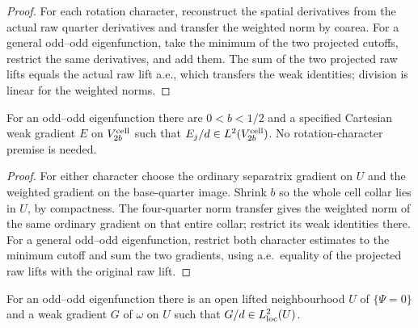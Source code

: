 \begin{proof}
\leanok
For each rotation character, reconstruct the spatial derivatives from
the actual raw quarter derivatives and transfer the weighted norm by coarea.
For a general odd--odd eigenfunction, take the minimum of the two projected
cutoffs, restrict the same derivatives, and add them.
The sum of the two projected raw lifts equals the actual raw lift a.e.,
which transfers the weak identities; division is linear for the weighted norms.
\end{proof}

\begin{lemma}
\label{lem:dd-cell-weighted-gradient}
\leanok
For an odd--odd eigenfunction there are $0<b<1/2$ and a specified
Cartesian weak gradient $E$ on $V_{2b}^{\rm cell}$ such that
$E_j/d\in L^2(V_{2b}^{\rm cell})$.
No rotation-character premise is needed.
\end{lemma}

\begin{proof}
\leanok
For either character choose the ordinary separatrix gradient on $U$
and the weighted gradient on the base-quarter image. Shrink $b$ so the
whole cell collar lies in $U$, by compactness.
The four-quarter norm transfer gives the weighted norm of the same ordinary
gradient on that entire collar; restrict its weak identities there.
For a general odd--odd eigenfunction, restrict both character estimates to
the minimum cutoff and sum the two gradients, using a.e.\ equality of the
projected raw lifts with the original raw lift.
\end{proof}

\begin{proposition}
\label{prop:dd-weighted-gradient}
\leanok
For an odd--odd eigenfunction there is an open lifted neighbourhood $U$
of $\{\Psi=0\}$ and a weak gradient $G$ of $\omega$ on $U$ such that
$G/d\in L^2_{\rm loc}(U)$.
\end{proposition}

